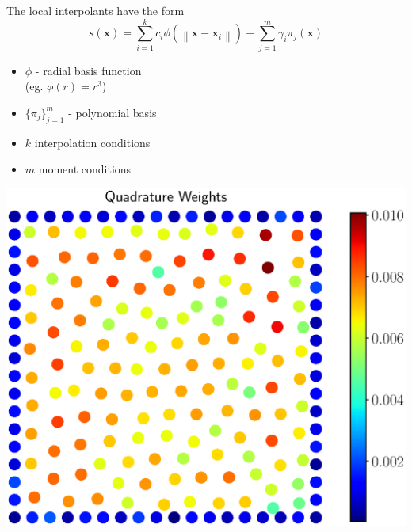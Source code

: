 \documentclass[paperwidth=40in,paperheight=32in,landscape]{baposter} %
\newcommand{\vecx}{\vec{x}}
\renewcommand{\vec}[1]{\mathbf{#1}}
\newcommand{\norm}[1]{\left\lVert #1 \right\rVert}
\begin{document}
\begin{poster}
{	The local interpolants have the form
	\vspace{-0.5em}
	\[
		s(\vecx) = \sum_{i=1}^k c_i \phi(\norm{\vecx - \vecx_i}) + \sum_{j=1}^m \gamma_i \pi_j(\vecx)
	\]
	\vspace{-2em}
	\begin{itemize}[leftmargin=*]
		\setlength\itemsep{-.4em}
		\item $\phi$ - radial basis function \\
		(eg. $\phi(r) = r^3$)
		\item $\{\pi_{j}\}_{j=1}^m$ - polynomial basis
		\item $k$ interpolation conditions
		\item $m$ moment conditions
	\end{itemize}
	\includegraphics[width=\linewidth, trim={0cm, 3cm, 0cm, 2cm}, clip=true]{images/weights}
	\vspace{-.3cm}
}


\end{poster}
\end{document}

